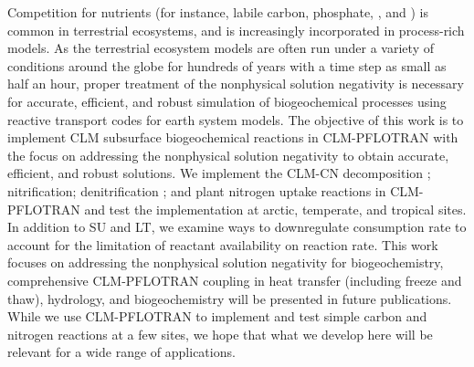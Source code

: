 \documentclass[gmd, manuscript]{copernicus}
\begin{document}
Competition for  nutrients (for instance, labile carbon, phosphate, ,
and ) is common in terrestrial ecosystems, and is increasingly
incorporated in process-rich models. As the terrestrial ecosystem models are
often run under a variety of conditions around the globe for hundreds of years
with a time step as small as half an hour, proper treatment of the
nonphysical solution negativity is necessary for accurate, efficient, and robust simulation
of biogeochemical processes using reactive transport codes for earth system
models. The objective of this work is to implement CLM subsurface
biogeochemical reactions in CLM-PFLOTRAN with the focus on addressing the
nonphysical solution negativity to obtain accurate, efficient, and robust solutions. We
implement the CLM-CN decomposition \citep{Bonan2012,Oleson2013,Thornton2005};
nitrification; denitrification \citep{Dickinson2002,Parton2001,Parton1996}; and
plant nitrogen uptake reactions in CLM-PFLOTRAN and test the implementation at
arctic, temperate, and tropical sites. In addition to SU and LT, %
we examine ways to downregulate consumption rate to account
for the limitation of reactant availability on reaction rate. This work
focuses on addressing the nonphysical solution negativity for biogeochemistry, %
 comprehensive CLM-PFLOTRAN coupling in heat transfer
(including freeze and thaw), hydrology,  and biogeochemistry will be presented
in future publications.  While we use CLM-PFLOTRAN to implement and test simple
carbon and nitrogen reactions at a few sites, we hope that what we develop here
will be relevant for a wide range of applications.





%

\end{document}
